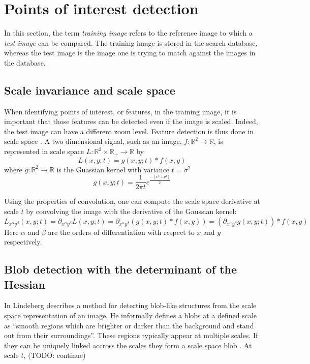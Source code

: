 \section{Points of interest detection}

In this section, the term \emph{training image} refers to the reference image to which a \emph{test image} can be compared. The training image is stored in the search database, whereas the test image is the image one is trying to match against the images in the database.

\subsection{Scale invariance and scale space}

When identifying points of interest, or features, in the training image, it is important that those features can be detected even if the image is scaled. Indeed, the test image can have a different zoom level. Feature detection is thus done in scale space \cite{Lindeberg98featuredetection}. A two dimensional signal, such as an image, $f: \mathbb{R}^2 \to \mathbb{R}$, is represented in scale space $L: \mathbb{R}^2 \times \mathbb{R}_+ \to \mathbb{R}$ by
\begin{equation}
L(x,y;t) = g(x,y;t) \ast f(x,y)
\end{equation}
where $g: \mathbb{R}^2 \to \mathbb{R}$ is the Guassian kernel with variance $t=\sigma^2$
\begin{equation}
g(x,y;t) = \frac{1}{2 \pi t} e ^ \frac{-(x^2+y^2)}{2t}
\end{equation}

Using the properties of convolution, one can compute the scale space derivative at scale $t$ by convolving the image with the derivative of the Gaussian kernel:
\begin{equation}
    L_{x^\alpha y^\beta} (x,y;t) = \partial _{x^\alpha y^\beta} L(x,y;t) = \partial _{x^\alpha y^\beta} (g(x,y;t) \ast f(x,y)) = (\partial _{x^\alpha y^\beta} g(x,y;t)) \ast f(x,y)
\end{equation}
Here $\alpha$ and $\beta$ are the orders of differentiation with respect to $x$ and $y$ respectively.

\subsection{Blob detection with the determinant of the Hessian}

In \cite{Lindeberg93detectingsalient} Lindeberg describes a method for detecting blob-like structures from the scale space representation of an image. He informally defines a blobs at a defined scale as ``smooth regions which are brighter or darker than the background and stand out from their surroundings''. These regions typically appear at multiple scales. If they can be uniquely linked accross the scales they form a scale space blob \cite{Lindeberg93detectingsalient}. At scale $t$, (TODO: continue)

